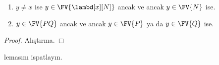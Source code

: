 \documentclass[../../../include/open-logic-section]{subfiles}
\begin{document}
\begin{lem}
  \begin{enumerate}
    \item {} $y \neq x$ ise $y \in
      \FV{\lambd[x][N]}$ ancak ve ancak $y \in \FV{N}$ ise.
    \item {} $y \in \FV{PQ}$ ancak ve ancak
      $y \in \FV{P}$ ya da $y \in \FV{Q}$ ise.
    \end{enumerate}
\end{lem}

\begin{proof}
  Alıştırma.
\end{proof}

\begin{prob}
   lemasını ispatlayın.
\end{prob}
\end{document}
